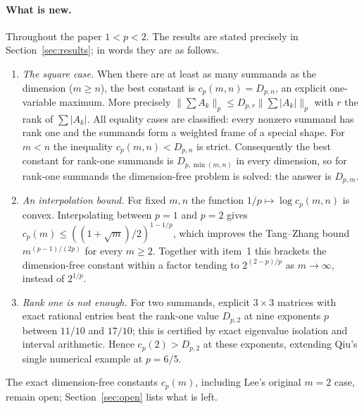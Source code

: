 \documentclass[11pt,a4paper]{article}
\numberwithin{equation}{section}
\theoremstyle{definition}
\theoremstyle{remark}
\begin{document}
\paragraph{What is new.}
Throughout the paper \(1<p<2\). The results are stated precisely in
Section~\ref{sec:results}; in words they are as follows.
\begin{enumerate}
\item \emph{The square case.} When there are at least as many summands as
the dimension (\(m\ge n\)), the best constant is
\(c_p(m,n)=D_{p,n}\), an explicit one-variable maximum. More precisely
\(\|\sum A_k\|_p\le D_{p,r}\|\sum|A_k|\|_p\) with \(r\) the rank of
\(\sum|A_k|\). All equality cases are classified: every nonzero summand
has rank one and the summands form a weighted frame of a special shape.
For \(m<n\) the inequality \(c_p(m,n)<D_{p,n}\) is strict.
Consequently the best constant for rank-one summands is
\(D_{p,\min(m,n)}\) in every dimension, so for rank-one summands the
dimension-free problem is solved: the answer is \(D_{p,m}\).
\item \emph{An interpolation bound.} For fixed \(m,n\) the function
\(1/p\mapsto\log c_p(m,n)\) is convex. Interpolating between \(p=1\)
and \(p=2\) gives \(c_p(m)\le((1+\sqrt m)/2)^{1-1/p}\), which improves
the Tang--Zhang bound \(m^{(p-1)/(2p)}\) for every \(m\ge2\). Together
with item~1 this brackets the dimension-free constant within a factor
tending to \(2^{(2-p)/p}\) as \(m\to\infty\), instead of \(2^{1/p}\).
\item \emph{Rank one is not enough.} For two summands, explicit
\(3\times3\) matrices with exact rational entries beat the rank-one
value \(D_{p,2}\) at nine exponents \(p\) between \(11/10\) and
\(17/10\); this is certified by exact eigenvalue isolation and interval
arithmetic. Hence \(c_p(2)>D_{p,2}\) at these exponents, extending
Qiu's single numerical example at \(p=6/5\).
\end{enumerate}
The exact dimension-free constants \(c_p(m)\), including Lee's original
\(m=2\) case, remain open; Section~\ref{sec:open} lists what is left.
\end{document}
